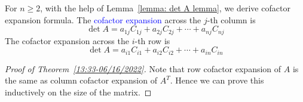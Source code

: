 \documentclass{beamer}
\theoremstyle{definition}
\theoremstyle{remark}
\begin{document}
\begin{frame}[t]
For $n\geq2$, with the help of Lemma~\ref{lemma: det A lemma}, we derive cofactor expansion formula.
\pause
The \textcolor{blue}{cofactor expansion} across the $j$-th column is
\[
\det A=a_{1j}C_{1j}+a_{2j}C_{2j}+\cdots+a_{nj}C_{nj}
\]\pause
The cofactor expansion across the $i$-th row is
\[
\det A=a_{i1}C_{i1}+a_{i2}C_{i2}+\cdots+a_{in}C_{in}
\]
\begin{center}
\end{center}
\pause
\begin{proof}[Proof of Theorem~\ref{13:33-06/16/2022}]
Note that row cofactor expansion of $A$ is the same as column cofactor expansion of $A^T$. Hence we can prove this inductively on the size of the matrix.
\end{proof}
\end{frame}
\end{document}
